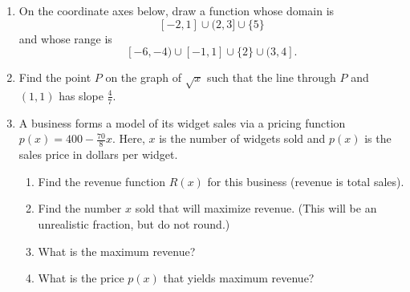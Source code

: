 \begin{enumerate}
\vfill

\item On the coordinate axes below, draw a function whose domain is
  $$[-2,1]\cup(2,3]\cup\{5\}$$
  and whose range is
  $$[-6,-4)\cup[-1,1]\cup\{2\}\cup(3,4].$$

\begin{center}
\end{center}




\clearpage

\item Find the point $P$ on the graph of $\sqrt{x}$ such that the line
  through $P$ and $(1,1)$ has slope $\displaystyle \frac{4}{7}$.
  \vfill




\item A business forms a model of its widget sales via a pricing
  function $p(x) = 400-\frac{70}{8}x$. Here, $x$ is the number of
  widgets sold and $p(x)$ is the sales price in dollars per widget.
\begin{enumerate}
\item Find the revenue function $R(x)$ for this business (revenue is
  total sales).
\item Find the number $x$ sold that will maximize revenue. (This will
  be an unrealistic fraction, but do not round.)
\item What is the maximum revenue? 
\item What is the price $p(x)$ that yields maximum revenue?
\end{enumerate}

\vfill



\end{enumerate}

